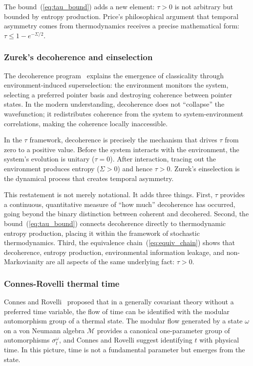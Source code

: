 \documentclass[12pt]{article}
\theoremstyle{definition}
\theoremstyle{remark}
\newcommand{\tauasym}{\tau}
\begin{document}
The bound~(\ref{eq:tau_bound}) adds a new element:
$\tauasym > 0$ is not arbitrary but bounded by entropy production.
Price's philosophical argument that temporal asymmetry comes from
thermodynamics receives a precise mathematical form:
$\tauasym \leq 1 - e^{-\Sigma/2}$.

\subsubsection{Zurek's decoherence and einselection}

The decoherence program~\cite{Zurek2003,Zeh1970} explains the
emergence of classicality through environment-induced
superselection: the environment monitors the system, selecting
a preferred pointer basis and destroying coherence between
pointer states.  In the modern understanding, decoherence does
not ``collapse'' the wavefunction; it redistributes coherence
from the system to system-environment correlations, making the
coherence locally inaccessible.

In the $\tauasym$ framework, decoherence is precisely the
mechanism that drives $\tauasym$ from zero to a positive value.
Before the system interacts with the environment, the system's
evolution is unitary ($\tauasym = 0$).  After interaction, tracing
out the environment produces entropy ($\Sigma > 0$) and hence
$\tauasym > 0$.  Zurek's einselection is the dynamical process
that creates temporal asymmetry.

This restatement is not merely notational.  It adds three things.
First, $\tauasym$ provides a continuous, quantitative measure of
``how much'' decoherence has occurred, going beyond the binary
distinction between coherent and decohered.
Second, the bound~(\ref{eq:tau_bound}) connects decoherence
directly to thermodynamic entropy production, placing it within
the framework of stochastic thermodynamics.
Third, the equivalence chain~(\ref{eq:equiv_chain}) shows that
decoherence, entropy production, environmental information
leakage, and non-Markovianity are all aspects of the same
underlying fact: $\tauasym > 0$.

\subsubsection{Connes-Rovelli thermal time}

Connes and Rovelli~\cite{Connes1994} proposed that in a generally
covariant theory without a preferred time variable, the flow of
time can be identified with the modular automorphism group of a
thermal state.  The modular flow generated by a state $\omega$
on a von Neumann algebra $\mathcal{M}$ provides a canonical
one-parameter group of automorphisms $\sigma_t^\omega$, and
Connes and Rovelli suggest identifying $t$ with physical time.
In this picture, time is not a fundamental parameter but
emerges from the state.
\end{document}
